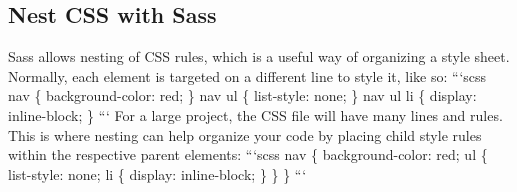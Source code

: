 \documentclass{article}%
\begin{document}
\subsection{Nest CSS with Sass}%
\label{subsec:NestCSSwithSass}%
Sass allows nesting of CSS rules, which is a useful way of organizing a style sheet.\newline%
Normally, each element is targeted on a different line to style it, like so:\newline%
```scss\newline%
nav \{\newline%
  background{-}color: red;\newline%
\}\newline%
nav ul \{\newline%
  list{-}style: none;\newline%
\}\newline%
nav ul li \{\newline%
  display: inline{-}block;\newline%
\}\newline%
```\newline%
For a large project, the CSS file will have many lines and rules. This is where nesting can help organize your code by placing child style rules within the respective parent elements:\newline%
```scss\newline%
nav \{\newline%
  background{-}color: red;\newline%
  ul \{\newline%
    list{-}style: none;\newline%
    li \{\newline%
      display: inline{-}block;\newline%
    \}\newline%
  \}\newline%
\}\newline%
```\newline%

%
\end{document}
